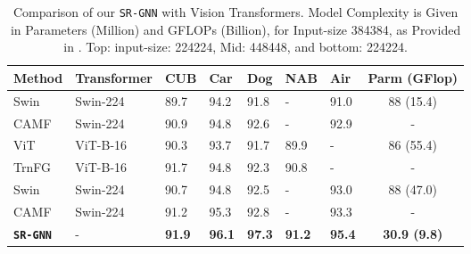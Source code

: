 \documentclass[journal]{IEEEtran}
\begin{document}
\begin{table}[h]
\vspace{ -0.3cm}
\begin{center}
 \caption{ Comparison of our \texttt{SR-GNN} with Vision Transformers. 
 Model Complexity is Given in Parameters (Million) and GFLOPs (Billion), for Input-size 384384, as Provided in \cite{liu2021swin}. Top: input-size: 224224, Mid: 448448, 
 and bottom: 224224. }
  \label{table:ViT}
 \vspace{ -0.3cm}
\begin{tabular}{|p{14 mm}|p{11.0 mm} p{2.5 mm} p{2.8 mm} p{2.8 mm} p{3.2 mm} p{3.3 mm}|c|}
 \hline
Method & Transformer & CUB & Car  & Dog & NAB  & Air & Parm (GFlop)\\
    \hline
Swin \cite{liu2021swin} & Swin-224 & 89.7 &94.2  &91.8 &- &91.0 & 88 (15.4)\\
CAMF \cite{miao2021complemental} & Swin-224 & 90.9 &94.8  &92.6 &-  &92.9 &-\\
\hline
ViT \cite{dosovitskiy2020image} & ViT-B-16 & 90.3 &93.7  &91.7 &89.9 &-   &86 (55.4)\\
TrnFG \cite{he2021transfg} & ViT-B-16 & 91.7 &94.8  &92.3 & 90.8 &- &-\\
Swin \cite{liu2021swin} & Swin-224 & 90.7 &94.8  &92.5 &-  &93.0 & 88 (47.0)\\
CAMF \cite{miao2021complemental} & Swin-224 & 91.2 &95.3  &92.8 &-  &93.3 &-\\
\hline
\textbf{\texttt{SR-GNN}} &- &\textbf{91.9} & \textbf{96.1} & \textbf{97.3} & \textbf{91.2}  & \textbf{95.4} & \textbf{30.9 (9.8)}\\
\hline
\end{tabular}
 \end{center}
  \vspace{- 0.3 cm}
\end{table}
\end{document}
